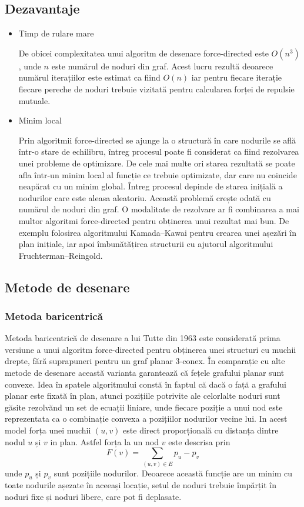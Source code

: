 \subsection{Dezavantaje}

\begin{itemize}
\item Timp de rulare mare

De obicei complexitatea unui algoritm de desenare force-directed este \(O(n^3)\), unde \(n\) este numărul de noduri din graf. 
Acest lucru rezultă deoarece numărul iterațiilor este estimat ca fiind \(O(n)\) iar pentru fiecare iterație fiecare 
pereche de noduri trebuie vizitată pentru calcularea forței de repulsie mutuale.

\item Minim local

Prin algoritmii force-directed se ajunge la o structură în care nodurile se află într-o stare de echilibru, întreg procesul poate 
fi considerat ca fiind rezolvarea unei probleme de optimizare.
De cele mai multe ori starea rezultată se poate afla într-un minim local al funcție ce trebuie optimizate, dar care nu 
coincide neapărat cu un minim global. Întreg procesul depinde de starea inițială a nodurilor care este aleasa aleatoriu. 
Această problemă crește odată cu numărul de noduri din graf. O modalitate de rezolvare ar fi combinarea a mai multor 
algoritmi force-directed pentru obținerea unui rezultat mai bun. De exemplu folosirea algoritmului Kamada–Kawai pentru 
crearea unei așezări în plan inițiale, iar apoi îmbunătățirea structurii cu ajutorul algoritmului Fruchterman–Reingold.

\end{itemize}

\subsection{Metode de desenare}
\subsubsection{Metoda baricentrică}
Metoda baricentrică de desenare a lui Tutte din 1963 este considerată prima versiune a unui algoritm force-directed 
pentru obținerea unei structuri cu muchii drepte, fără suprapuneri pentru un graf planar 3-conex. În comparație cu alte 
metode de desenare această varianta garantează că fețele grafului planar sunt convexe. Idea în spatele algoritmului 
constă în faptul că dacă o față a grafului planar este fixată în plan, atunci pozițiile potrivite ale celorlalte noduri sunt 
găsite rezolvănd un set de ecuații liniare, unde fiecare poziție a unui nod este reprezentata ca o combinație convexa a 
pozițiilor nodurilor vecine lui. In acest model forța unei muchii \((u,v)\) este direct proporțională cu distanța dintre 
nodul \(u\) și \(v\) in plan. Astfel forța la un nod \(v\) este descrisa prin 
\[F(v)=\sum_{(u,v) \in E} p_u-p_v\] 
unde \(p_u\) și \(p_v\) sunt pozițiile nodurilor. Deoarece această funcție are un minim cu toate nodurile așezate în aceeași locație, setul 
de noduri trebuie împărțit în noduri fixe și noduri libere, care pot fi deplasate. \cite{force}

